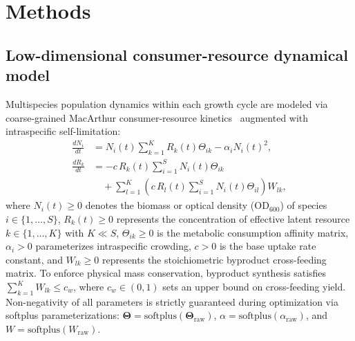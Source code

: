 \section*{Methods}
\label{sec:methods}

\subsection*{Low-dimensional consumer-resource dynamical model}
Multispecies population dynamics within each growth cycle are modeled via coarse-grained MacArthur consumer-resource kinetics~\cite{macarthur1970species,tilman1982resource} augmented with intraspecific self-limitation:
\begin{align}
\frac{dN_i}{dt} &= N_i(t) \sum_{k=1}^K R_k(t) \Theta_{ik} - \alpha_i N_i(t)^2, \label{eq:methods_crm_N} \\
\frac{dR_k}{dt} &= - c \, R_k(t) \sum_{i=1}^S N_i(t) \Theta_{ik} \nonumber \\
&\quad + \sum_{l=1}^K \left( c \, R_l(t) \sum_{i=1}^S N_i(t) \Theta_{il} \right) W_{lk}, \label{eq:methods_crm_R}
\end{align}
where $N_i(t) \ge 0$ denotes the biomass or optical density ($\text{OD}_{600}$) of species $i \in \{1, \dots, S\}$, $R_k(t) \ge 0$ represents the concentration of effective latent resource $k \in \{1, \dots, K\}$ with $K \ll S$, $\Theta_{ik} \ge 0$ is the metabolic consumption affinity matrix, $\alpha_i > 0$ parameterizes intraspecific crowding, $c > 0$ is the base uptake rate constant, and $W_{lk} \ge 0$ represents the stoichiometric byproduct cross-feeding matrix. To enforce physical mass conservation, byproduct synthesis satisfies $\sum_{k=1}^K W_{lk} \le c_w$, where $c_w \in (0, 1)$ sets an upper bound on cross-feeding yield. Non-negativity of all parameters is strictly guaranteed during optimization via softplus parameterizations: $\mathbf{\Theta} = \text{softplus}(\mathbf{\Theta}_{\text{raw}})$, $\alpha = \text{softplus}(\alpha_{\text{raw}})$, and $W = \text{softplus}(W_{\text{raw}})$.

